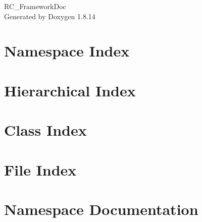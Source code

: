 \documentclass[twoside]{book}
\newcommand{\+}{\discretionary{\mbox{\scriptsize$\hookleftarrow$}}{}{}}
\newcommand{\clearemptydoublepage}{%
  \newpage{\pagestyle{empty}\cleardoublepage}%
}
\begin{document}
\hypersetup{pageanchor=false,
             bookmarksnumbered=true,
             pdfencoding=unicode
            }
\begin{titlepage}
\vspace*{7cm}
\begin{center}%
{\Large R\+C\+\_\+\+Framework\+Doc }\\
\vspace*{1cm}
{\large Generated by Doxygen 1.8.14}\\
\end{center}
\end{titlepage}
\clearemptydoublepage
{}
\tableofcontents
\clearemptydoublepage
{}
\hypersetup{pageanchor=true}

\chapter{Namespace Index}

\chapter{Hierarchical Index}

\chapter{Class Index}

\chapter{File Index}

\chapter{Namespace Documentation}

\end{document}

